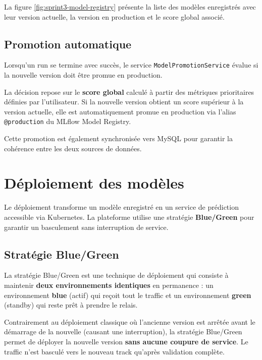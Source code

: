 La figure \ref{fig:sprint3-model-registry} présente la liste des
modèles enregistrés avec leur version actuelle, la version en
production et le score global associé.


\subsection{Promotion automatique}
\label{subsec:sprint3-promotion}

Lorsqu'un run se termine avec succès, le service
\texttt{ModelPromotionService} évalue si la nouvelle version doit
être promue en production.

La décision repose sur le \textbf{score global} calculé à partir des
métriques prioritaires définies par l'utilisateur. Si la nouvelle
version obtient un score supérieur à la version actuelle, elle est
automatiquement promue en production via l'alias \texttt{@production}
du MLflow Model Registry.

Cette promotion est également synchronisée vers MySQL pour garantir
la cohérence entre les deux sources de données.



\section{Déploiement des modèles}
\label{sec:sprint3-deployment}

Le déploiement transforme un modèle enregistré en un service de
prédiction accessible via Kubernetes. La plateforme utilise une
stratégie \textbf{Blue/Green} pour garantir un basculement sans
interruption de service.


\subsection{Stratégie Blue/Green}
\label{subsec:sprint3-blue-green}

La stratégie Blue/Green est une technique de déploiement qui consiste
à maintenir \textbf{deux environnements identiques} en permanence :
un environnement \textbf{blue} (actif) qui reçoit tout le traffic
et un environnement \textbf{green} (standby) qui reste prêt à
prendre le relais.

Contrairement au déploiement classique où l'ancienne version est
arrêtée avant le démarrage de la nouvelle (causant une interruption),
la stratégie Blue/Green permet de déployer la nouvelle version
\textbf{sans aucune coupure de service}. Le traffic n'est basculé
vers le nouveau track qu'après validation complète.

